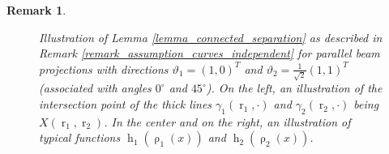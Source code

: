\documentclass[12pt]{article}
\newtheorem{remark}[theorem]{Remark}
\DeclareMathOperator{\NN}{\mathbb{N}}
\DeclareMathOperator{\rayvariable}{r}
\DeclareMathOperator{\rayinverse}{\rho}
\DeclareMathOperator{\stripfkt}{h}
\begin{document}
\begin{remark}
\begin{figure}
 \qquad  {}
\caption{
Illustration of Lemma \ref{lemma_connected_separation} as described in Remark \ref{remark_assumption_curves_independent} for parallel beam projections with directions $\vartheta_1=(1,0)^T$ and $\vartheta_2=\frac{1}{\sqrt 2} (1,1)^T$ (associated with angles $0^\circ$ and $45^\circ$).
On the left, an illustration of the intersection point of the thick lines $\gamma_1(\rayvariable_1,\cdot)$ and $\gamma_2(\rayvariable_2,\cdot)$ being $X(\rayvariable_1,\rayvariable_2)$.
In the center and on the right, an illustration of typical functions $\stripfkt_1(\rayinverse_1(x))$ and $\stripfkt_2(\rayinverse_2(x))$.
}
\label{fig_stripe_images_parallel}
\end{figure}
\end{remark}
\end{document}
